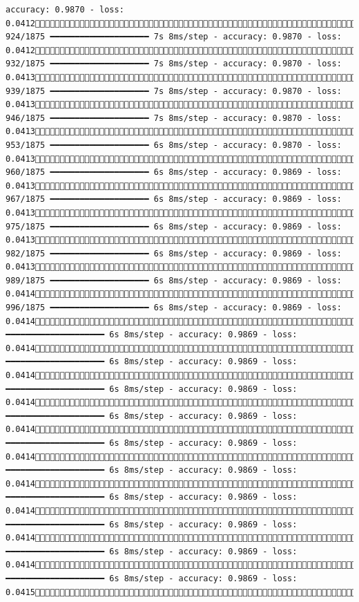 \documentclass[
  letterpaper,
  DIV=11,
  numbers=noendperiod]{scrreprt}
\begin{document}
\begin{verbatim}
accuracy: 0.9870 - loss: 0.0412 924/1875 ━━━━━━━━━━━━━━━━━━━━ 7s 8ms/step - accuracy: 0.9870 - loss: 0.0412 932/1875 ━━━━━━━━━━━━━━━━━━━━ 7s 8ms/step - accuracy: 0.9870 - loss: 0.0413 939/1875 ━━━━━━━━━━━━━━━━━━━━ 7s 8ms/step - accuracy: 0.9870 - loss: 0.0413 946/1875 ━━━━━━━━━━━━━━━━━━━━ 7s 8ms/step - accuracy: 0.9870 - loss: 0.0413 953/1875 ━━━━━━━━━━━━━━━━━━━━ 6s 8ms/step - accuracy: 0.9870 - loss: 0.0413 960/1875 ━━━━━━━━━━━━━━━━━━━━ 6s 8ms/step - accuracy: 0.9869 - loss: 0.0413 967/1875 ━━━━━━━━━━━━━━━━━━━━ 6s 8ms/step - accuracy: 0.9869 - loss: 0.0413 975/1875 ━━━━━━━━━━━━━━━━━━━━ 6s 8ms/step - accuracy: 0.9869 - loss: 0.0413 982/1875 ━━━━━━━━━━━━━━━━━━━━ 6s 8ms/step - accuracy: 0.9869 - loss: 0.0413 989/1875 ━━━━━━━━━━━━━━━━━━━━ 6s 8ms/step - accuracy: 0.9869 - loss: 0.0414 996/1875 ━━━━━━━━━━━━━━━━━━━━ 6s 8ms/step - accuracy: 0.9869 - loss: 0.04141003/1875 ━━━━━━━━━━━━━━━━━━━━ 6s 8ms/step - accuracy: 0.9869 - loss: 0.04141010/1875 ━━━━━━━━━━━━━━━━━━━━ 6s 8ms/step - accuracy: 0.9869 - loss: 0.04141017/1875 ━━━━━━━━━━━━━━━━━━━━ 6s 8ms/step - accuracy: 0.9869 - loss: 0.04141024/1875 ━━━━━━━━━━━━━━━━━━━━ 6s 8ms/step - accuracy: 0.9869 - loss: 0.04141031/1875 ━━━━━━━━━━━━━━━━━━━━ 6s 8ms/step - accuracy: 0.9869 - loss: 0.04141038/1875 ━━━━━━━━━━━━━━━━━━━━ 6s 8ms/step - accuracy: 0.9869 - loss: 0.04141045/1875 ━━━━━━━━━━━━━━━━━━━━ 6s 8ms/step - accuracy: 0.9869 - loss: 0.04141052/1875 ━━━━━━━━━━━━━━━━━━━━ 6s 8ms/step - accuracy: 0.9869 - loss: 0.04141059/1875 ━━━━━━━━━━━━━━━━━━━━ 6s 8ms/step - accuracy: 0.9869 - loss: 0.04141066/1875 ━━━━━━━━━━━━━━━━━━━━ 6s 8ms/step - accuracy: 0.9869 - loss: 0.04151073/1875 
\end{verbatim}
\end{document}
